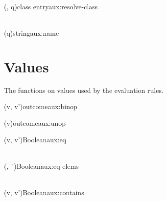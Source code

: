 \begin{auxfunction}{\resolveClass(\rho, q)}{class entry}{aux:resolve-class}

\begin{align*}

\end{align*}
\end{auxfunction}

\begin{auxfunction}{\nameOf(q)}{string}{aux:name}

\end{auxfunction}

\section{Values}
\label{sec:mf-values}

The functions on values used by the evaluation rules.


\begin{auxfunction}{\hat{\odot}(v, v')}{outcome}{aux:binop}

\begin{center}
\small

\end{center}
\end{auxfunction}

\begin{auxfunction}{\hat{\ominus}(v)}{outcome}{aux:unop}

\begin{center}
\small

\end{center}
\end{auxfunction}

\begin{auxfunction}{\eqOp(v, v')}{Boolean}{aux:eq}

\begin{align*}

\end{align*}
\end{auxfunction}

\begin{auxfunction}{\eqElems(, \,')}{Boolean}{aux:eq-elems}

\begin{align*}

\end{align*}
\end{auxfunction}

\begin{auxfunction}{\memOp(v, v')}{Boolean}{aux:contains}

\begin{align*}

\end{align*}
\end{auxfunction}

